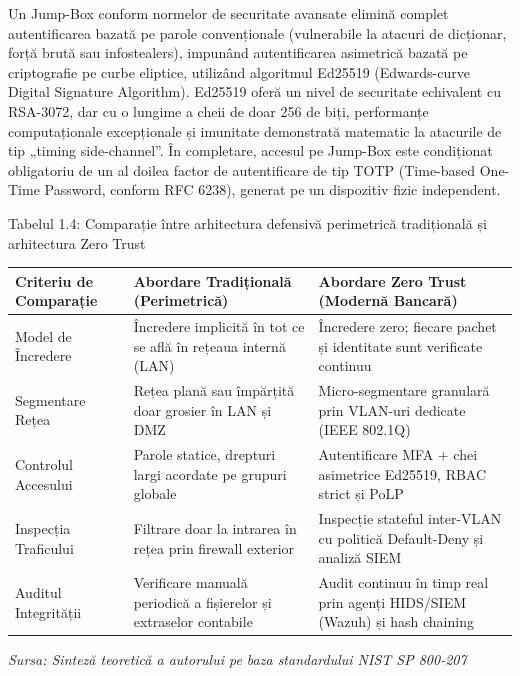 Un Jump-Box conform normelor de securitate avansate elimină complet autentificarea bazată pe parole convenționale (vulnerabile la atacuri de dicționar, forță brută sau infostealers), impunând autentificarea asimetrică bazată pe criptografie pe curbe eliptice, utilizând algoritmul Ed25519 (Edwards-curve Digital Signature Algorithm). Ed25519 oferă un nivel de securitate echivalent cu RSA-3072, dar cu o lungime a cheii de doar 256 de biți, performanțe computaționale excepționale și imunitate demonstrată matematic la atacurile de tip „timing side-channel”. În completare, accesul pe Jump-Box este condiționat obligatoriu de un al doilea factor de autentificare de tip TOTP (Time-based One-Time Password, conform RFC 6238), generat pe un dispozitiv fizic independent.

Tabelul 1.4: Comparație între arhitectura defensivă perimetrică tradițională și arhitectura Zero Trust

\begin{table}[htbp]
\centering
\small
\begin{tabular}{p{} p{} p{}}
\toprule
Criteriu de Comparație & Abordare Tradițională (Perimetrică) & Abordare Zero Trust (Modernă Bancară) \\
\midrule
Model de Încredere & Încredere implicită în tot ce se află în rețeaua internă (LAN) & Încredere zero; fiecare pachet și identitate sunt verificate continuu \\
Segmentare Rețea & Rețea plană sau împărțită doar grosier în LAN și DMZ & Micro-segmentare granulară prin VLAN-uri dedicate (IEEE 802.1Q) \\
Controlul Accesului & Parole statice, drepturi largi acordate pe grupuri globale & Autentificare MFA + chei asimetrice Ed25519, RBAC strict și PoLP \\
Inspecția Traficului & Filtrare doar la intrarea în rețea prin firewall exterior & Inspecție stateful inter-VLAN cu politică Default-Deny și analiză SIEM \\
Auditul Integrității & Verificare manuală periodică a fișierelor și extraselor contabile & Audit continuu în timp real prin agenți HIDS/SIEM (Wazuh) și hash chaining \\
\bottomrule
\end{tabular}
\end{table}

\textit{Sursa: Sinteză teoretică a autorului pe baza standardului NIST SP 800-207}

